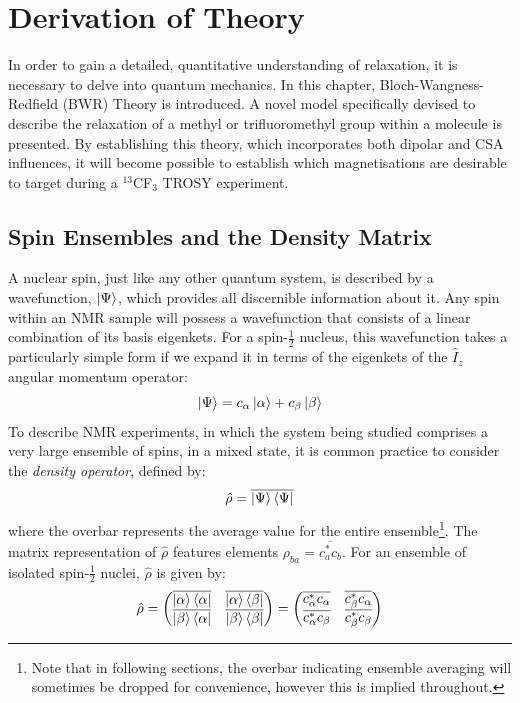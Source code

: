 \renewcommand{\arraystretch}{0.6}
\setlength\arraycolsep{2pt}
\renewcommand{\thefootnote}{\fnsymbol{footnote}}
\chapter{Derivation of Theory}
In order to gain a detailed, quantitative understanding of relaxation, it is necessary to delve into quantum mechanics. In this chapter, Bloch-Wangness-Redfield (BWR) Theory is introduced. A novel model specifically devised to describe the relaxation of a methyl or trifluoromethyl group within a molecule is presented. By establishing this theory, which incorporates both dipolar and CSA influences, it will become possible to establish which magnetisations are desirable to target during a $^{13}$CF$_3$ TROSY experiment.
\section{Spin Ensembles and the Density Matrix}
A nuclear spin, just like any other quantum system, is described by a wavefunction, $\ket{\Psi}$, which provides all discernible information about it. Any spin within an NMR sample will possess a wavefunction that consists of a linear combination of its basis eigenkets. For a spin-$\frac{1}{2}$ nucleus, this wavefunction takes a particularly simple form if we expand it in terms of the eigenkets of the $\hat{I}_z$ angular momentum operator:
\begin{equation}
\ket{\Psi}=c_{\alpha}\ket{\alpha}+c_{\beta}\ket{\beta}
\end{equation}
To describe NMR experiments, in which the system being studied comprises a very large ensemble of spins, in a mixed state, it is common practice to consider the \textit{density operator}, defined by:
\begin{equation}
\hat{\rho}=\overline{\ket{\Psi}\bra{\Psi}}
\end{equation}
where the overbar represents the average value for the entire ensemble\footnote{Note that in following sections, the overbar indicating ensemble averaging will sometimes be dropped for convenience, however this is implied throughout.}. The matrix representation of $\hat{\rho}$ features elements $\rho_{ba}=\overline{c_a^*c_b}$. For an ensemble of isolated spin-$\frac{1}{2}$ nuclei, $\hat{\rho}$ is given by:
\begin{equation}
\hat{\rho} = \mqty(\overline{\ket{\alpha}\bra{\alpha}} & \overline{\ket{\alpha}\bra{\beta}} \\ \overline{\ket{\beta}\bra{\alpha}} & \overline{\ket{\beta}\bra{\beta}}) = \mqty(\overline{c_{\alpha}^*c_{\alpha}} & \overline{c_{\beta}^*c_{\alpha}} \\ \overline{c_{\alpha}^*c_{\beta}} & \overline{c_{\beta}^*c_{\beta}})
\end{equation}
